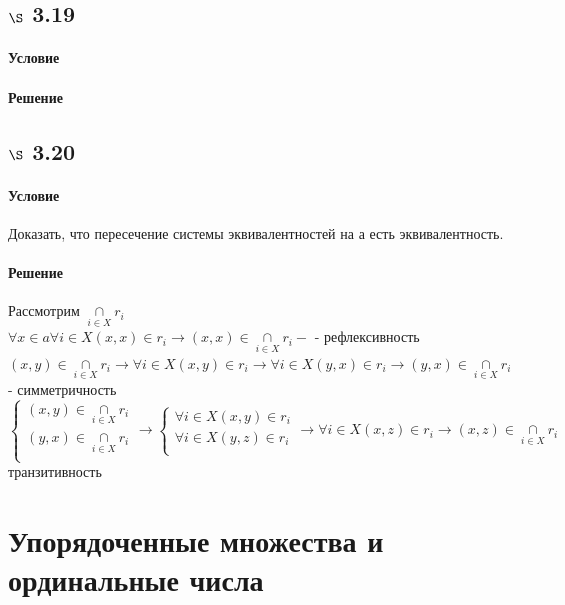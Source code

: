 \documentclass[a4paper,12pt]{article}
\DeclareMathOperator*{\mycap}{\cap}
\begin{document}
\subsection*{$\S$ 3.19}
\paragraph*{Условие}
\paragraph*{Решение}

\subsection*{$\S$ 3.20}
\paragraph*{Условие}
Доказать, что пересечение системы эквивалентностей на а есть эквивалентность.
\paragraph*{Решение}
Рассмотрим $\mycap\limits_{i \in X} r_i $\\
$\forall x \in a  \forall i \in X (x,x) \in r_i \rightarrow (x,x) \in \mycap\limits_{i \in X} r_i -$ - рефлексивность\\
$(x,y) \in \mycap\limits_{i \in X} r_i \rightarrow \forall i \in X (x,y) \in r_i \rightarrow \forall i \in X (y,x) \in r_i \rightarrow (y,x) \in \mycap\limits_{i \in X} r_i$ - симметричность\\
\begin{equation*}
\begin{cases} 
(x,y) \in  \mycap\limits_{i \in X} r_i \\
(y,x) \in  \mycap\limits_{i \in X} r_i \\
\end{cases} \rightarrow
\begin{cases} 
\forall i \in X (x,y) \in   r_i \\
\forall i \in X (y,z) \in   r_i \\
\end{cases} 
\rightarrow
\forall i \in X (x,z) \in r_i \rightarrow (x,z) \in \mycap\limits_{i \in X} r_i
\end{equation*}
транзитивность
\section{Упорядоченные множества и ординальные числа}
\end{document}
